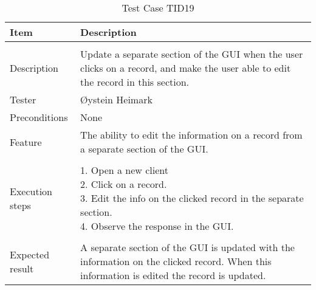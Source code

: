 \begin{table}
\caption{Test Case TID19}
\centering
\begin{tabular}{ l p{13cm} }
\hline 
 Item            & Description        \\ 
\hline \\ [-2.0ex]
 Description     &Update a separate section of the GUI when the user clicks on a record, and make the user able to edit the record in this section. \\ 
 Tester          & Øystein Heimark                  \\ 
 Preconditions   & None\\ 
 Feature         & The ability to edit the information on a record from a separate section of the GUI.   \vspace{3pt}                     \\ 
\hline \\ [-1.5ex]
 Execution steps & \pbox{13cm}{1. Open a new client \\ 2. Click on a record. \\ 3. Edit the info on the clicked record in the separate section. \\ 4. Observe the response in the GUI. } \vspace{3pt} \\
\hline \\ [-1.5ex]
 Expected result & A separate section of the GUI is updated with the information on the clicked record. When this information is edited the record is updated. \\
\hline 
\end{tabular}
\label{table:testcasetid19}
\end{table}

